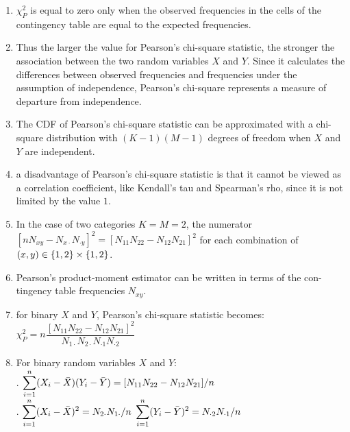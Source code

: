 \begin{enumerate}
    \item $\chi^2_P$ is equal to zero only when the observed frequencies in the cells of the contingency table are equal to the expected frequencies.
    \hfill \cite{statistics/book/Statistics-for-Data-Scientists/Maurits-Kaptein}

    \item Thus the larger the value for Pearson’s chi-square statistic, the stronger the association between the two random variables $X$ and $Y $.
    Since it calculates the differences between observed frequencies and frequencies under the assumption of independence, Pearson’s chi-square represents a measure of departure from independence.
    \hfill \cite{statistics/book/Statistics-for-Data-Scientists/Maurits-Kaptein}

    \item The CDF of Pearson’s chi-square statistic can be approximated with a chi-square distribution with $(K - 1)(M - 1)$ degrees of freedom when $X$ and $Y$ are independent.
    \hfill \cite{statistics/book/Statistics-for-Data-Scientists/Maurits-Kaptein}

    \item a disadvantage of Pearson’s chi-square statistic is that it cannot be viewed as a correlation coefficient, like Kendall’s tau and Spearman’s rho, since it is not limited by the value $1$.
    \hfill \cite{statistics/book/Statistics-for-Data-Scientists/Maurits-Kaptein}

    \item  In the case of two categories $K = M = 2$, the numerator $[n N_{x y} - N_{x\cdot } N_{\cdot y} ]^2 = [N_{11} N_{22} - N_{12} N_{21}]^2$ for each combination of $(x, y) \in \left\{1, 2\right\} \times \left\{1, 2\right\}$.
    \hfill \cite{statistics/book/Statistics-for-Data-Scientists/Maurits-Kaptein}

    \item Pearson’s product-moment estimator can be written in terms of the con- tingency table frequencies $N_{x y }$.
    \hfill \cite{statistics/book/Statistics-for-Data-Scientists/Maurits-Kaptein}

    \item for binary $X$ and $Y $, Pearson’s chi-square statistic becomes:
    $
        \chi^2_P = n \dfrac{[N_{11} N_{22} - N_{12} N_{21}]^2}{N_{1\cdot } N_{2\cdot } N_{\cdot 1} N_{\cdot 2}}
    $
    \hfill \cite{statistics/book/Statistics-for-Data-Scientists/Maurits-Kaptein}

    \item For binary random variables $X$ and $Y$:
    \hfill \cite{statistics/book/Statistics-for-Data-Scientists/Maurits-Kaptein}
    \\[0.3cm]
    .\hfill
    $\displaystyle\sum^n_{i=1} (X_i - \bar{X})(Y_i - \bar{Y} ) = [N_{11} N_{22} - N_{12} N_{21}]/n$
    \hfill \cite{statistics/book/Statistics-for-Data-Scientists/Maurits-Kaptein}
    \\[0.3cm]
    .\hfill
    $ \displaystyle\sum^n_{i=1} (X_i - \bar{X})^2 = N_{2\cdot } N_{1\cdot }/n $
    \hfill
    $ \displaystyle\sum^n_{i=1} (Y_i - \bar{Y} )^2 = N_{\cdot 2} N_{\cdot 1}/n $
    \hfill \cite{statistics/book/Statistics-for-Data-Scientists/Maurits-Kaptein}


\end{enumerate}
